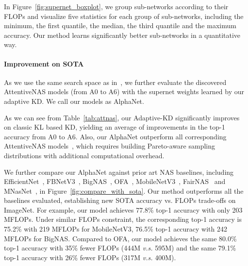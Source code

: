 \documentclass{article}
\begin{document}
In Figure~\ref{fig:supernet_boxplot}, we group sub-networks according to their FLOPs and visualize five statistics for each group of sub-networks, including the minimum, the first quantile, the median, the third quantile and the maximum accuracy. Our method learns significantly better sub-networks in a quantitative way.


\paragraph{Improvement on SOTA}
As we use the same search space as in~\citet{wang2020attentivenas},
we further evaluate the discovered AttentiveNAS models (from A0 to A6)
with the supernet weights learned by our adaptive KD.
We call our models as AlphaNet. 

As we can see from  Table~\ref{tab:attnas}, 
our Adaptive-KD significantly improves on classic KL based KD, yielding 
an average of  improvements in the top-1 accuracy from A0 to A6. 
Also, our AlphaNet outperform all corresponding AttentiveNAS models~\citep{wang2020attentivenas}, which requires building Pareto-aware sampling distributions with additional computational overhead.  

We further compare our AlphaNet against prior art NAS baselines, including  EfficientNet~\citep{tan2019efficientnet}, FBNetV3~\citep{dai2020fbnetv3}, BigNAS~\citep{yu2020bignas}, OFA~\citep{cai2019once}, MobileNetV3~\citep{howard2019searching}, FairNAS~\citep{chu2019fairnas} and  MNasNet~\citep{tan2019mnasnet}, in Figure~\ref{fig:compare_with_sota}. 
Our method outperforms all the baselines evaluated, establishing new SOTA accuracy vs. FLOPs trade-offs on ImageNet. 
For example, our model achieves 77.8\% top-1 accuracy with only 203 MFLOPs. Under similar FLOPs constraint, the  corresponding top-1 accuracy is 75.2\%  with 219 MFLOPs for MobileNetV3, 76.5\% top-1 accuracy with 242 MFLOPs for BigNAS. 
Compared to OFA, our model achieves the same 80.0\% top-1 accuracy with 35\% fewer FLOPs (444M \emph{v.s.} 595M) and the same 79.1\% top-1 accuracy with  26\% fewer FLOPs (317M \emph{v.s.} 400M).
\end{document}
